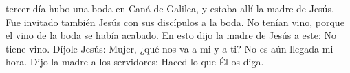  tercer día hubo una boda en Caná de Galilea, y estaba allí la madre de Jesús. Fue invitado también Jesús con sus discípulos a la boda.
No tenían vino, porque el vino de la boda se había acabado. En esto dijo la madre de Jesús a este: No tiene vino. Díjole Jesús: Mujer,
¿qué nos va a mi y a ti? No es aún llegada mi hora. Dijo la madre a los servidores: Haced lo que Él os diga.